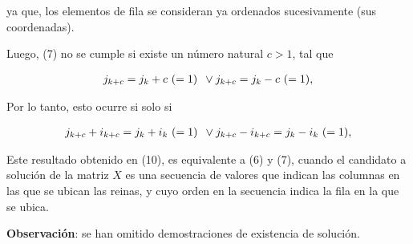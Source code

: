 \documentclass[letterpaper,11pt,spanish]{article}
\begin{document}
ya que, los elementos de fila se consideran ya ordenados sucesivamente (sus coordenadas).

Luego, (7) no se cumple si existe un número natural $c>1$, tal que

\begin{equation}
\begin{matrix}
j_{k+c} = j_k+c \text{ } (= 1)\\
\end{matrix}\\ \vee
\begin{matrix}
j_{k+c} = j_k-c \text{ } (= 1)\\
\end{matrix},
\end{equation}

Por lo tanto, esto ocurre si solo si

\begin{equation}
\begin{matrix}
j_{k+c} + i_{k+c} = j_k + i_k \text{ } (= 1)\\
\end{matrix}\\ \vee
\begin{matrix}
j_{k+c} - i_{k+c} = j_k - i_k \text{ } (= 1)\\
\end{matrix},
\end{equation}

Este resultado obtenido en (10), es equivalente a (6) y (7), cuando el candidato a solución de la matriz $X$ es una secuencia de valores que indican las columnas en las que se ubican las reinas, y cuyo orden en la secuencia indica la fila en la que se ubica.

\textbf{Observación}: se han omitido demostraciones de existencia de solución.
\end{document}

